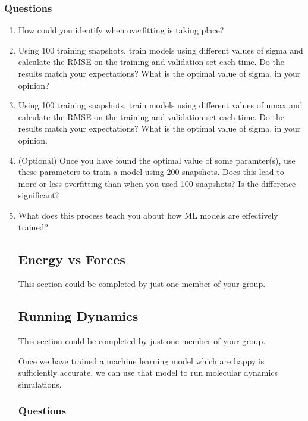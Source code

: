 \documentclass{article}
\begin{document}
\begin{enumerate}
\subsubsection*{Questions}

\begin{enumerate}
\item How could you identify when overfitting is taking place?
\item Using 100 training snapshots, train models using different values of sigma and calculate the RMSE on the training and validation set each time. Do the results match your expectations? What is the optimal value of sigma, in your opinion?
\item Using 100 training snapshots, train models using different values of nmax and calculate the RMSE on the training and validation set each time. Do the results match your expectations? What is the optimal value of sigma, in your opinion.

\item (Optional) Once you have found the optimal value of some paramter(s), use these parameters to train a model using 200 snapshots. Does this lead to more or less overfitting than when you used 100 snapshots? Is the difference significant?
\item What does this process teach you about how ML models are effectively trained?

\subsection{Energy vs Forces}

This section could be completed by just one member of your group.

\subsection{Running Dynamics}

This section could be completed by just one member of your group.

Once we have trained a machine learning model which are happy is sufficiently accurate, we can use that model to run molecular dynamics simulations.

\subsubsection*{Questions}

\begin{enumerate}


\end{enumerate}
\end{enumerate}
\end{enumerate}
\end{document}
